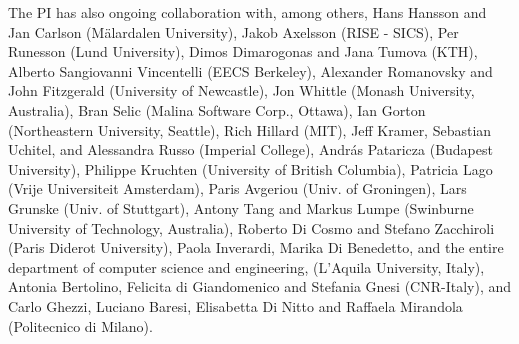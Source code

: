 \documentclass[12pt]{article}
\begin{document}
The PI has also ongoing collaboration with, among others, Hans Hansson and Jan Carlson (M\"alardalen University), Jakob Axelsson (RISE - SICS), Per Runesson (Lund University), Dimos Dimarogonas and Jana Tumova (KTH), %
Alberto Sangiovanni Vincentelli (EECS Berkeley),
Alexander Romanovsky and John Fitzgerald (University of Newcastle), Jon Whittle (Monash University, Australia), Bran Selic (Malina Software Corp., Ottawa), %
Ian Gorton
(Northeastern University, Seattle), Rich Hillard (MIT), Jeff Kramer, Sebastian Uchitel, and Alessandra Russo (Imperial College), Andr\'as Pataricza (Budapest University), Philippe Kruchten (University of British Columbia), Patricia Lago (Vrije Universiteit Amsterdam), Paris Avgeriou (Univ. of Groningen), Lars Grunske (Univ. of Stuttgart), Antony Tang and Markus Lumpe (Swinburne University of Technology, Australia), Roberto Di Cosmo and Stefano Zacchiroli (Paris Diderot University), Paola Inverardi, Marika Di Benedetto, and the entire department of computer science and engineering, %
(L'Aquila University, Italy), Antonia Bertolino, Felicita di Giandomenico and Stefania Gnesi (CNR-Italy), and Carlo Ghezzi, Luciano Baresi, Elisabetta Di Nitto and Raffaela Mirandola (Politecnico di Milano). %
\end{document}
